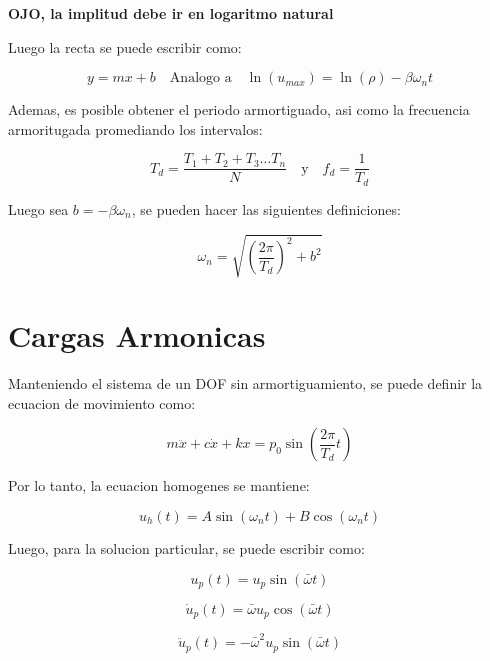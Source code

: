 \documentclass{article}  %
\begin{document}
\textbf{OJO, la implitud debe ir en logaritmo natural}

Luego la recta se puede escribir como:

\begin{equation}
    y = mx + b \quad \text{Analogo a} \quad \ln(u_{max}) = \ln(\rho) - \beta \omega_n t
\end{equation}

Ademas, es posible obtener el periodo armortiguado, asi como la frecuencia armoritugada promediando los intervalos:

\begin{equation}
    T_d = \frac{T_1 + T_2 + T_3 \dots T_n}{N} \quad \text{y} \quad f_d = \frac{1}{T_d}
\end{equation}

Luego sea $b = -\beta \omega_n$, se pueden hacer las siguientes definiciones:

\begin{equation}
    \omega_n = \sqrt{(\frac{2 \pi}{T_d})^2 + b^2 } 
\end{equation}

\section{Cargas Armonicas}

Manteniendo el sistema de un DOF sin armortiguamiento, se puede definir la ecuacion de movimiento como:

\begin{equation}
    m \ddot{x} + c \dot{x} + kx = p_0 \sin(\frac{2\pi}{T_d}t)
\end{equation}

Por lo tanto, la ecuacion homogenes se mantiene:

\begin{equation}
    u_h(t) = A \sin(\omega_n t) + B \cos(\omega_n t)
\end{equation}

Luego, para la solucion particular, se puede escribir como:

\begin{equation}
    u_p(t) = u_p \sin(\bar{\omega} t )
\end{equation}

\begin{equation}
    \dot{u}_p(t) = \bar{\omega} u_p \cos(\bar{\omega} t )
\end{equation}

\begin{equation}
    \ddot{u}_p(t) = -\bar{\omega}^2 u_p \sin(\bar{\omega} t )
\end{equation}
\end{document}

